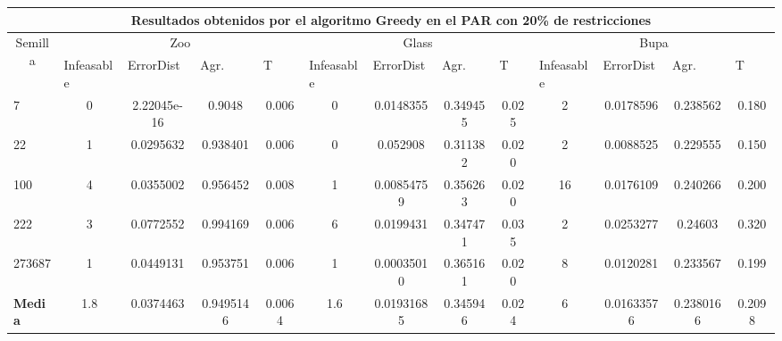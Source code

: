 \begin{table}[H]
	\scriptsize

	\begin{adjustwidth}{-1cm}{-1cm}%
	
	\begin{tabular}{|l|c|c|c|c|c|c|c|c|c|c|c|c|}
	\hline
	\multicolumn{13}{|c|}{\textbf{Resultados obtenidos por el algoritmo Greedy en el PAR con 20\% de restricciones}}                                                                                                                                                                                                                                                                                                                                            \\ \hline
	\multicolumn{1}{|c|}{\multirow{2}{*}{Semilla}} & \multicolumn{4}{c|}{Zoo}                                                                                          & \multicolumn{4}{c|}{Glass}                                                                                         & \multicolumn{4}{c|}{Bupa}                                                                                          \\ \cline{2-13} 
	\multicolumn{1}{|c|}{}                                  & \multicolumn{1}{l|}{Infeasable} & \multicolumn{1}{l|}{ErrorDist} & \multicolumn{1}{l|}{Agr.} & \multicolumn{1}{l|}{T} & \multicolumn{1}{l|}{Infeasable} & \multicolumn{1}{l|}{ErrorDist} & \multicolumn{1}{l|}{Agr.} & \multicolumn{1}{l|}{T} & \multicolumn{1}{l|}{Infeasable} & \multicolumn{1}{l|}{ErrorDist} & \multicolumn{1}{l|}{Agr.} & \multicolumn{1}{l|}{T} \\ \hline
	7      & 0 & 2.22045e-16 & 0.9048 & 0.006                    & 0 & 0.0148355 & 0.349455 & 0.025 			 			& 2 & 0.0178596 & 0.238562 & 0.180  \\ \hline
	22     &  1 & 0.0295632 & 0.938401 & 0.006                    &	0 & 0.052908 & 0.311382 & 0.020					    & 2 & 0.0088525 & 0.229555 & 0.150		\\ \hline
	100    &   4 & 0.0355002 & 0.956452 & 0.008		             &	1 & 0.00854759 & 0.356263 & 0.020				        & 16 & 0.0176109 & 0.240266 & 0.200		\\ \hline
	222    &  3 & 0.0772552 & 0.994169 & 0.006                    &	6 & 0.0199431 & 0.347471 & 0.035				        & 2 & 0.0253277 & 0.24603 & 0.320		\\ \hline
	273687 &  1 & 0.0449131 & 0.953751 & 0.006                   &  1 & 0.00035010 & 0.365161 & 0.020					    & 8 & 0.0120281 & 0.233567 & 0.199		\\ \hline
	\textbf{Media} & 1.8 & 0.0374463 &  0.9495146  & 0.0064       & 1.6 & 0.01931685 & 0.345946 & 0.024     & 6 & 0.01633576 & 0.2380166 & 0.2098                  \\ \hline
	\end{tabular}
	
	\end{adjustwidth}
	
\end{table}	

